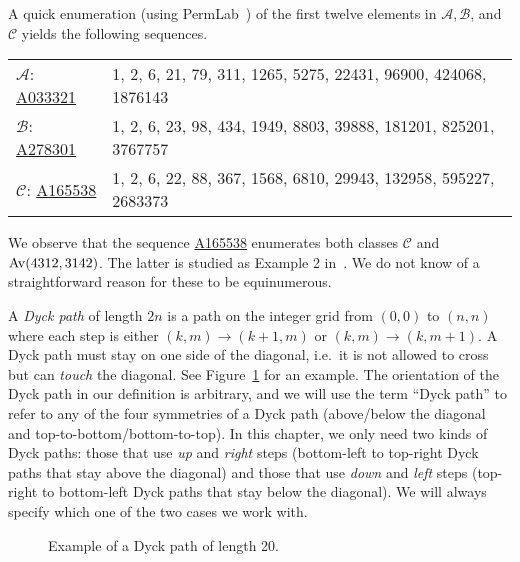 \documentclass[12pt, a4paper, twoside]{report}
\begin{document}
\noindent A quick enumeration (using PermLab~\cite{albertpermlab}) of the first twelve elements in $\mathcal{A}, \mathcal{B}$, and $\mathcal{C}$ yields the following sequences.

\begin{center}
\begin{tabular}{l l}
$\mathcal{A}$: \href{http://oeis.org/A033321}{A033321}& 1, 2, 6, 21, 79, 311, 1265, 5275, 22431, 96900, 424068, 1876143\\
$\mathcal{B}$: \href{http://oeis.org/A278301}{A278301}& 1, 2, 6, 23, 98, 434, 1949, 8803, 39888, 181201, 825201, 3767757\\
$\mathcal{C}$: \href{http://oeis.org/A165538}{A165538}& 1, 2, 6, 22, 88, 367, 1568, 6810, 29943, 132958, 595227, 2683373\\
\end{tabular}
\end{center}
We observe that the sequence \href{http://oeis.org/A165538}{A165538} enumerates both classes $\mathcal{C}$ and $\mathrm{Av}(4312, 3142)$. The latter is studied as Example 2 in~\cite{albert2012inflations}. We do not know of a straightforward reason for these to be equinumerous.

A \emph{Dyck path} of length $2n$ is a path on the integer grid from $(0,0)$ to $(n,n)$ where each step is either $(k,m) \to (k+1,m)$ or $(k,m) \to (k,m+1)$. A Dyck path must stay on one side of the diagonal, i.e.~it is not allowed to cross but can \emph{touch} the diagonal. See Figure~\ref{fig:dyckexample} for an example. The orientation of the Dyck path in our definition is arbitrary, and we will use the term ``Dyck path'' to refer to any of the four symmetries of a Dyck path (above/below the diagonal and top-to-bottom/bottom-to-top). In this chapter, we only need two kinds of Dyck paths: those that use \emph{up} and \emph{right} steps (bottom-left to top-right Dyck paths that stay above the diagonal) and those that use \emph{down} and \emph{left} steps (top-right to bottom-left Dyck paths that stay below the diagonal). We will always specify which one of the two cases we work with.\\
\begin{figure}[!ht]
\begin{center}
\end{center}
\caption{\small Example of a Dyck path of length 20.}
\label{fig:dyckexample}
\end{figure}
\end{document}
